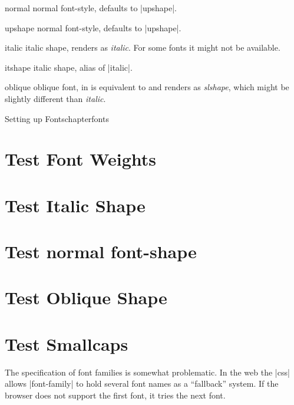 \begin{marglist}
\item[normal] normal font-style, defaults to |upshape|.
\item[upshape] normal font-style, defaults to |upshape|. 
\item[italic] italic shape, renders as {\itshape italic}. For some fonts it might not be available.
\item[itshape] italic shape, alias of |italic|.
\item[oblique] oblique font, in \latexe is equivalent to \cmd{\slshape} and renders as {\slshape slshape}, which might be slightly different than {\itshape italic}.
\end{marglist}


\begin{texexample}{Setting up Fonts}{chapterfonts}
\chapter[fonts]{Test Font Weights}
\lorem
{}
\chapter{Test Italic Shape}
\lorem
{}
\chapter{Test normal font-shape}
\lorem
{}
\chapter{Test Oblique Shape}
\lorem
{}
\chapter{Test Smallcaps}
\lorem
\end{texexample}

The specification of font families is somewhat problematic. In the web the |css| allows |font-family|  to hold several font names as a “fallback” system. If the browser does not support the first font, it tries the next font.

